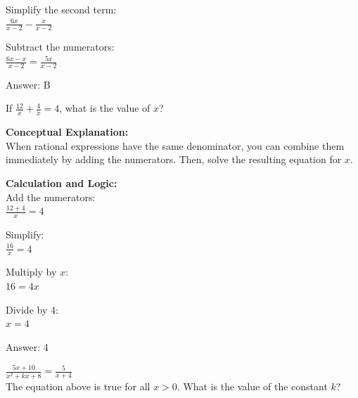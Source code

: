 \documentclass[11pt,paper=a4,answers]{exam}
\begin{document}
\begin{questions}
\begin{solution}
\vspace{10pt}

Simplify the second term: \\
$\frac{6x}{x-2} - \frac{x}{x-2}$

\vspace{10pt}

Subtract the numerators: \\
$\frac{6x - x}{x-2} = \frac{5x}{x-2}$

\vspace{25pt}

Answer: \colorbox{yellow!100}{B}
\end{solution}

\vspace{40pt}

\question
If $\frac{12}{x} + \frac{4}{x} = 4$, what is the value of $x$?

\begin{solution}
\textbf{Conceptual Explanation:} \\
When rational expressions have the same denominator, you can combine them immediately by adding the numerators. Then, solve the resulting equation for $x$.

\vspace{20pt}

\textbf{Calculation and Logic:} \\
Add the numerators: \\
$\frac{12 + 4}{x} = 4$

\vspace{10pt}

Simplify: \\
$\frac{16}{x} = 4$

\vspace{10pt}

Multiply by $x$: \\
$16 = 4x$

\vspace{10pt}

Divide by 4: \\
$x = 4$

\vspace{25pt}

Answer: \colorbox{yellow!100}{4}
\end{solution}

\vspace{40pt}

\question
$\frac{5x + 10}{x^2 + kx + 8} = \frac{5}{x+4}$ \\
The equation above is true for all $x > 0$. What is the value of the constant $k$?


\end{questions}
\end{document}
